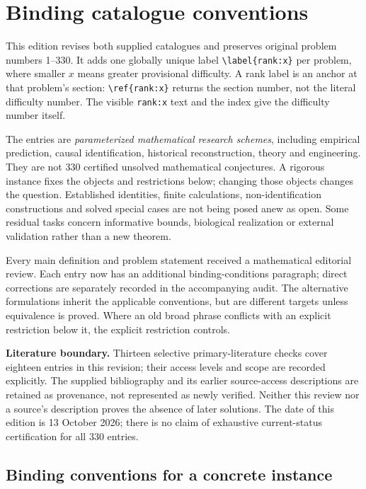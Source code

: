 \documentclass[11pt]{article}
\begin{document}
\section*{Binding catalogue conventions}
This edition revises both supplied catalogues and preserves original problem numbers 1--330. It adds one globally unique label \verb|\label{rank:x}| per problem, where smaller $x$ means greater provisional difficulty. A rank label is an anchor at that problem's section: \verb|\ref{rank:x}| returns the section number, not the literal difficulty number. The visible \texttt{rank:x} text and the index give the difficulty number itself.

The entries are \emph{parameterized mathematical research schemes}, including empirical prediction, causal identification, historical reconstruction, theory and engineering. They are not 330 certified unsolved mathematical conjectures. A rigorous instance fixes the objects and restrictions below; changing those objects changes the question. Established identities, finite calculations, non-identification constructions and solved special cases are not being posed anew as open. Some residual tasks concern informative bounds, biological realization or external validation rather than a new theorem.

Every main definition and problem statement received a mathematical editorial review. Each entry now has an additional binding-conditions paragraph; direct corrections are separately recorded in the accompanying audit. The alternative formulations inherit the applicable conventions, but are different targets unless equivalence is proved. Where an old broad phrase conflicts with an explicit restriction below it, the explicit restriction controls.

\textbf{Literature boundary.} Thirteen selective primary-literature checks cover eighteen entries in this revision; their access levels and scope are recorded explicitly. The supplied bibliography and its earlier source-access descriptions are retained as provenance, not represented as newly verified. Neither this review nor a source's description proves the absence of later solutions. The date of this edition is 13 October 2026; there is no claim of exhaustive current-status certification for all 330 entries.

\subsection*{Binding conventions for a concrete instance}
\end{document}
